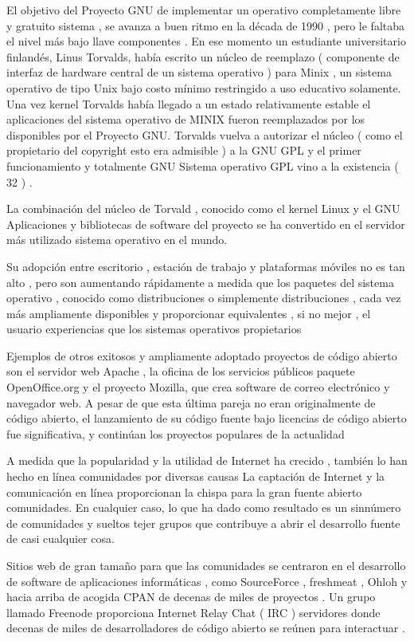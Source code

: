\documentclass[a4paper,11pt]{article}
\begin{document}
El objetivo del Proyecto GNU de implementar un operativo completamente libre y gratuito
sistema , se avanza a buen ritmo en la década de 1990 , pero le faltaba el nivel más bajo llave
componentes . En ese momento un estudiante universitario finlandés, Linus Torvalds, había escrito
un núcleo de reemplazo ( componente de interfaz de hardware central de un sistema operativo )
para Minix , un sistema operativo de tipo Unix bajo costo mínimo restringido a
uso educativo solamente. Una vez kernel Torvalds había llegado a un estado relativamente estable el
aplicaciones del sistema operativo de MINIX fueron reemplazados por los disponibles
por el Proyecto GNU. Torvalds vuelva a autorizar el núcleo ( como el propietario del copyright
esto era admisible ) a la GNU GPL y el primer funcionamiento y totalmente GNU
Sistema operativo GPL vino a la existencia ( 32 ) .

La combinación del núcleo de Torvald , conocido como el kernel Linux y el GNU
Aplicaciones y bibliotecas de software del proyecto se ha convertido en el servidor más utilizado
sistema operativo en el mundo.

Su adopción entre escritorio , estación de trabajo y plataformas móviles no es tan alto , pero son
aumentando rápidamente a medida que los paquetes del sistema operativo , conocido como distribuciones o simplemente
distribuciones , cada vez más ampliamente disponibles y proporcionar equivalentes , si no mejor , el usuario
experiencias que los sistemas operativos propietarios 

 Ejemplos de otros exitosos y ampliamente adoptado proyectos de código abierto son el servidor web Apache , la oficina de los servicios públicos paquete OpenOffice.org y el proyecto Mozilla, que crea software de correo electrónico y navegador web. A pesar de que esta última pareja no eran originalmente de código abierto, el lanzamiento de su código fuente bajo licencias de código abierto fue significativa, y continúan los proyectos populares de la actualidad 

A medida que la popularidad y la utilidad de Internet ha crecido , también lo han hecho en línea
comunidades por diversas causas 
La captación de Internet y la comunicación en línea proporcionan la chispa para la gran fuente abierto
comunidades. En cualquier caso, lo que ha dado como resultado es un sinnúmero de comunidades y sueltos tejer
grupos que contribuye a abrir el desarrollo fuente de casi cualquier cosa.

Sitios web de gran tamaño para que las comunidades se centraron en el desarrollo de software de aplicaciones informáticas ,
como SourceForce , freshmeat , Ohloh y hacia arriba de acogida CPAN de decenas de
miles de proyectos . Un grupo llamado Freenode proporciona Internet Relay Chat ( IRC )
servidores donde decenas de miles de desarrolladores de código abierto se reúnen para interactuar .
\end{document}
